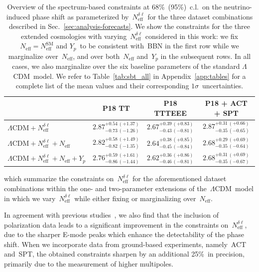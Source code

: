\documentclass[11pt]{article}
\numberwithin{equation}{section}
\newcommand{\Neff}{N_\mathrm{eff}}
\newcommand{\Nmultipole}{N_\mathrm{eff}^{\delta\ell}}
\begin{document}
\begin{table}
	\centering
	\begin{tabular}{l c c c}
			\toprule
															& P18 TT										& P18 TTTEEE									& P18 + ACT + SPT								\\
			\midrule[0.065em]
		$\Lambda\mathrm{CDM} + \Nmultipole$ 				& $2.87^{+0.54\, (+1.37)}_{-0.73\, (-1.26)}$	& $2.67^{+0.39\, (+0.83)}_{-0.43\, (-0.81)}$	& $2.87^{+0.31\, (+0.66)}_{-0.35\, (-0.65)}$	\\[4pt]
		$\Lambda\mathrm{CDM} + \Nmultipole + \Neff$ 		& $2.82^{+0.58\, (+1.49)}_{-0.82\, (-1.35)}$	& $2.64^{+0.38\, (+0.85)}_{-0.45\, (-0.84)}$	& $2.68^{+0.29\, (+0.69)}_{-0.35\, (-0.64)}$	\\[4pt]
		$\Lambda\mathrm{CDM} + \Nmultipole + \Neff + Y_p$	& $2.76^{+0.59\, (+1.61)}_{-0.86\, (-1.44)}$	& $2.62^{+0.36\, (+0.86)}_{-0.46\, (-0.81)}$	& $2.68^{+0.31\, (+0.69)}_{-0.35\, (-0.67)}$	\\[2pt]
			\bottomrule
	\end{tabular}
	\caption{Overview of the spectrum-based constraints at 68\%~(95\%)~c.l.\ on the neutrino-induced phase shift as parameterized by~$\Nmultipole$ for the three dataset combinations described in Sec.~\ref{sec:analysis-forecasts}. We show the constraints for the three extended cosmologies with varying~$\Nmultipole$ considered in this work: we fix $\Neff = \Neff^\mathrm{SM}$ and $Y_p$~to be consistent with~BBN in the first row while we marginalize over~$\Neff$, and over both~$\Neff$ and~$Y_p$ in the subsequent rows. In all cases, we also marginalize over the six baseline parameters of the standard $\Lambda$CDM~model. We refer to Table~\ref{tab:sbt_all} in Appendix~\ref{app:tables} for a complete list of the mean values and their corresponding $1\sigma$~uncertainties.}
	\label{tab:N_deltaell_analysis}
\end{table}
which summarize the constraints on~$\Nmultipole$ for the aforementioned dataset combinations within the one- and two-parameter extensions of the~$\Lambda$CDM~model in which we vary~$\Nmultipole$ while either fixing or marginalizing over~$\Neff$.

In agreement with previous studies~\cite{Baumann:2015rya, Brust:2017nmv, Kreisch:2019yzn, Forastieri:2019cuf, Blinov:2020hmc, Das:2020xke, Brinckmann:2020bcn}, we also find that the inclusion of polarization data leads to a significant improvement in the constraints on~$\Nmultipole$, due to the sharper E-mode peaks which enhance the detectability of the phase shift. When we incorporate data from ground-based experiments, namely~ACT and~SPT, the obtained constraints sharpen by an additional 25\%~in precision, primarily due to the measurement of higher multipoles.
\end{document}
